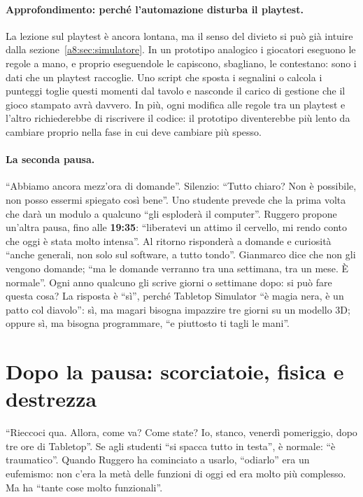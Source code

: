 \paragraph{Approfondimento: perché l'automazione disturba il playtest.} La lezione sul
playtest è ancora lontana, ma il senso del divieto si può già intuire dalla
sezione~\ref{a8:sec:simulatore}. In un prototipo analogico i giocatori eseguono le
regole a mano, e proprio eseguendole le capiscono, sbagliano, le contestano: sono i
dati che un playtest raccoglie. Uno script che sposta i segnalini o calcola i punteggi
toglie questi momenti dal tavolo e nasconde il carico di gestione che il gioco stampato
avrà davvero. In più, ogni modifica alle regole tra un playtest e l'altro richiederebbe
di riscrivere il codice: il prototipo diventerebbe più lento da cambiare proprio nella
fase in cui deve cambiare più spesso.

\paragraph{La seconda pausa.} ``Abbiamo ancora mezz'ora di domande''. Silenzio: ``Tutto
chiaro? Non è possibile, non posso essermi spiegato così bene''. Uno studente prevede
che la prima volta che darà un modulo a qualcuno ``gli esploderà il computer''.
Ruggero propone un'altra pausa, fino alle \textbf{19:35}: ``liberatevi un attimo il
cervello, mi rendo conto che oggi è stata molto intensa''. Al ritorno risponderà a
domande e curiosità ``anche generali, non solo sul software, a tutto tondo''. Gianmarco
dice che non gli vengono domande; ``ma le domande verranno tra una settimana, tra un
mese. È normale''. Ogni anno qualcuno gli scrive giorni o settimane dopo: si può fare
questa cosa? La risposta è ``sì'', perché Tabletop Simulator ``è magia nera, è un patto
col diavolo'': sì, ma magari bisogna impazzire tre giorni su un modello 3D; oppure sì,
ma bisogna programmare, ``e piuttosto ti tagli le mani''.

\section{Dopo la pausa: scorciatoie, fisica e destrezza}
\label{a8:sec:fisica}

``Rieccoci qua. Allora, come va? Come state? Io, stanco, venerdì pomeriggio, dopo tre
ore di Tabletop''. Se agli studenti ``si spacca tutto in testa'', è normale: ``è
traumatico''. Quando Ruggero ha cominciato a usarlo, ``odiarlo'' era un eufemismo: non
c'era la metà delle funzioni di oggi ed era molto più complesso. Ma ha ``tante cose
molto funzionali''.

